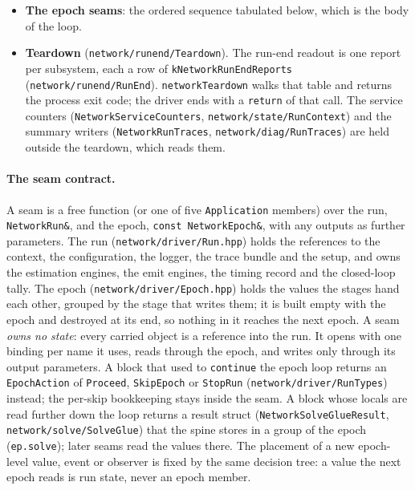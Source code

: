 \documentclass[main.tex]{subfiles}
\begin{document}
\begin{itemize}[leftmargin=*, itemsep=1pt]
      seed and the structurally unobservable ones, becomes the private
      block $\bm{A}_{r,\rx}$ of . The three
      receiver-position columns are dropped, because network station
      coordinates are held fixed; the split throws if one reaches
      $\bm{A}_{r,\rx}$. The blocks are then folded into the estimator
      serially in station order (\texttt{networkAssemblyConsume}).
       is formed from these two pieces.
\item \textbf{The epoch seams}: the ordered sequence tabulated
      below, which is the body of the loop.
\item \textbf{Teardown} (\texttt{network/runend/Teardown}). The run-end
      readout is one report per subsystem, each a row of
      \texttt{kNetworkRunEndReports} (\texttt{network/runend/RunEnd}).
      \texttt{networkTeardown} walks that table and returns the process
      exit code; the driver ends with a \texttt{return} of that call.
      The service counters (\texttt{NetworkServiceCounters},
      \texttt{network/state/RunContext}) and the summary writers
      (\texttt{NetworkRunTraces}, \texttt{network/diag/RunTraces}) are
      held outside the teardown, which reads them.
\end{itemize}

\paragraph{The seam contract.}
A seam is a free function (or one of five \texttt{Application} members)
over the run, \texttt{NetworkRun\&}, and the epoch,
\texttt{const NetworkEpoch\&}, with any outputs as further parameters.
The run (\texttt{network/driver/Run.hpp}) holds the references to the
context, the configuration, the logger, the trace bundle and the setup,
and owns the estimation engines, the emit engines, the timing record and
the closed-loop tally. The epoch (\texttt{network/driver/Epoch.hpp})
holds the values the stages hand each other, grouped by the stage that
writes them; it is built empty with the epoch and destroyed at its end,
so nothing in it reaches the next epoch. A seam \emph{owns no state}:
every carried object is a reference into the run. It opens with one
binding per name it uses, reads through the epoch, and writes only
through its output parameters. A block that used to \texttt{continue}
the epoch loop returns an \texttt{EpochAction} of \texttt{Proceed},
\texttt{SkipEpoch} or \texttt{StopRun} (\texttt{network/driver/RunTypes})
instead; the per-skip bookkeeping stays inside the seam. A block whose
locals are read further down the loop returns a result struct
(\texttt{NetworkSolveGlueResult},
\texttt{network/solve/SolveGlue}) that the spine stores in a group of the
epoch (\texttt{ep.solve}); later seams read the values there. The
placement of a new epoch-level value, event or observer is fixed by the
same decision tree: a value the next epoch reads is run state, never an
epoch member.
\end{document}
